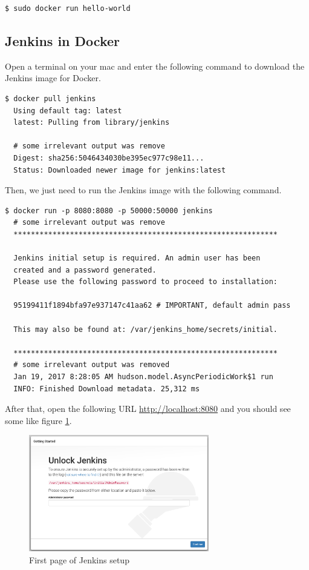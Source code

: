 \begin{verbatim}
$ sudo docker run hello-world
\end{verbatim}

\subsection{Jenkins in Docker}
Open a terminal on your mac and enter the following command to download the Jenkins image for Docker.

\begin{verbatim}
$ docker pull jenkins
  Using default tag: latest
  latest: Pulling from library/jenkins

  # some irrelevant output was remove
  Digest: sha256:5046434030be395ec977c98e11...
  Status: Downloaded newer image for jenkins:latest
\end{verbatim}

Then, we just need to run the Jenkins image with the following command.

\begin{verbatim}
$ docker run -p 8080:8080 -p 50000:50000 jenkins
  # some irrelevant output was remove
  *************************************************************

  Jenkins initial setup is required. An admin user has been 
  created and a password generated.
  Please use the following password to proceed to installation:

  95199411f1894bfa97e937147c41aa62 # IMPORTANT, default admin pass

  This may also be found at: /var/jenkins_home/secrets/initial.
 
  *************************************************************
  # some irrelevant output was removed
  Jan 19, 2017 8:28:05 AM hudson.model.AsyncPeriodicWork$1 run
  INFO: Finished Download metadata. 25,312 ms
\end{verbatim}

After that, open the following URL \url{http://localhost:8080} and you should see some like figure \ref{fig:jenkins-01}.

\begin{figure}[H]
	\centering
    \includegraphics[width=0.7\textwidth]{grafiken/jenkins-01}
    \caption{First page of Jenkins setup}
    \label{fig:jenkins-01}
\end{figure}

